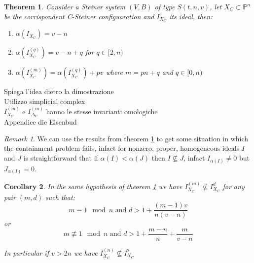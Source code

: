 \documentclass[]{book}
\theoremstyle{plain}
\newtheorem{teo}{Theorem}[section]
\newtheorem{cor}[teo]{Corollary}
\theoremstyle{remark}
\newtheorem{rem}{Remark}
\theoremstyle{definition}
\newcommand{\PP}{\mathbb{P}}
\begin{document}
 \begin{teo} \label{teo:alphaXC}
Consider a Steiner system $ (V,B) $ of type $ S(t,n,v) $, let $ X_C \subset \PP^n$ be the corrispondent C-Steiner configuaration and $ I_{X_C} $ its ideal, then:
\begin{enumerate}
\item $ \alpha(I_{X_C}) = v- n $
\item $ \alpha(I_{X_C}^{(q)}) = v- n +q  $ for $ q \in [2,n) $
\item $ \alpha(I_{X_C}^{(m)}) = \alpha(I_{X_C}^{(q)}) + pv $ where $ m=pn + q $ and $ q \in [0,n) $
\end{enumerate}
 \end{teo}
 
 \begin{tboxprop}
 Spiega l'idea dietro la dimostrazione\\
 Utilizzo simplicial complex\\
 $ I_{X_C}^{(m)} $ e $ I_{\Delta_C}^{(m)} $ hanno le stesse invarianti omologiche\\
 Appendice die Eisenbud
  \end{tboxprop}
  
\begin{rem}\label{rem:alphaXC}
We can use the results from theorem \ref{teo:alphaXC} to get some situation in which the containment problem fails, infact for nonzero, proper, homogeneous ideals $ I $ and $ J $ is straightforward that if $ \alpha(I) < \alpha(J) $ then $ I \not\subseteq J $, infact $ I_{ \alpha(I) } \neq 0$ but $ J_{ \alpha(I) } = 0 $. 
\end{rem}

\begin{cor}\label{cor:alphaXC}
In the same hypothesis of theorem \ref{teo:alphaXC} we have $ I_{X_C}^{(m)} \not \subseteq I_{X_C}^d $ for any pair $ (m,d) $ such that:
\begin{equation}\label{eq:cor:alphaXC:1}
	m \equiv 1 \mod n \text{ and } d > 1 + \frac{ (m-1)v }{ n(v-n)}
\end{equation}
or 
\begin{equation}\label{eq:cor:alphaXC:2}
	m \not \equiv 1 \mod n \text{ and } d > 1  + \frac{ m - n }{ n } + \frac{ m }{ v - n }
\end{equation}

 In particular if $ v > 2n $ we have $ I_{X_C}^{(n)} \not \subseteq I_{X_C}^2  $
 \end{cor}
  
\end{document}
